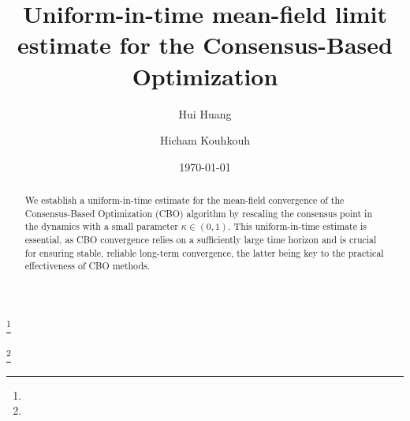 \documentclass[12pt]{amsart}
\numberwithin{equation}{section}
\begin{document}
\title[Uniform-in-time mean-field limit]{Uniform-in-time mean-field limit estimate for the Consensus-Based Optimization}
\thanks{
}




\author{Hui Huang}
\author{Hicham Kouhkouh}


\address{Hui Huang \textbf{ and } Hicham Kouhkouh\newline \indent
University of Graz\newline \indent
Department of Mathematics and Scientific Computing, NAWI Graz\newline \indent
Graz, Austria
}
\thanks{}















\date{\today}

\begin{abstract}
We establish a uniform-in-time estimate for the mean-field convergence of the Consensus-Based Optimization (CBO) algorithm by rescaling the consensus point in the dynamics with a small parameter $\kappa \in (0,1)$. This uniform-in-time estimate is essential, as CBO convergence relies on a sufficiently large time horizon and is crucial for ensuring stable, reliable long-term convergence, the latter being key to the practical effectiveness of CBO methods.
\end{abstract}
\end{document}
